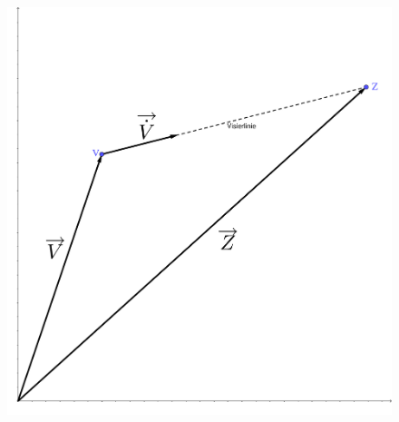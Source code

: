 \begin{figure}
    \centering
	\includegraphics[scale=0.2]{./papers/lambertw/Bilder/pursuerDGL2.pdf}
    \label{lambertw:grafic:pursuerDGL2}
\end{figure}

